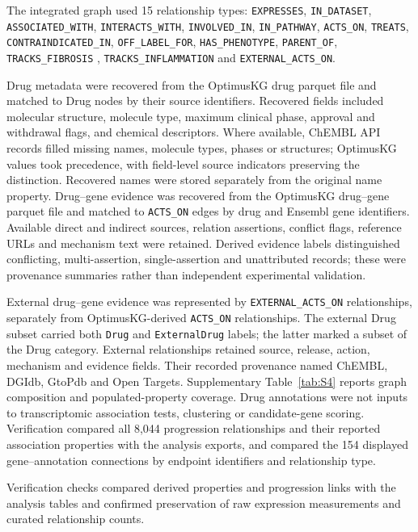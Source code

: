 \documentclass[11pt,a4paper]{article}
\begin{document}
\begingroup\raggedright
The integrated graph used 15 relationship types: \texttt{EXPRESSES}, \texttt{IN\_DATASET}, \texttt{ASSOCIATED\_WITH}, \texttt{INTERACTS\_WITH}, \texttt{INVOLVED\_IN}, \texttt{IN\_PATHWAY}, \texttt{ACTS\_ON}, \texttt{TREATS}, \texttt{CONTRAINDICATED\_IN}, \texttt{OFF\_LABEL\_FOR}, \texttt{HAS\_PHENOTYPE}, \texttt{PARENT\_OF}, \texttt{TRACKS\_FIBROSIS} , \texttt{TRACKS\_INFLAMMATION} and \texttt{EXTERNAL\_ACTS\_ON}.\par
\endgroup

Drug metadata were recovered from the OptimusKG drug parquet file and matched to Drug nodes by their source identifiers. Recovered fields included molecular structure, molecule type, maximum clinical phase, approval and withdrawal flags, and chemical descriptors. Where available, ChEMBL API records filled missing names, molecule types, phases or structures; OptimusKG values took precedence, with field-level source indicators preserving the distinction. Recovered names were stored separately from the original name property. Drug--gene evidence was recovered from the OptimusKG drug--gene parquet file and matched to \texttt{ACTS\_ON} edges by drug and Ensembl gene identifiers. Available direct and indirect sources, relation assertions, conflict flags, reference URLs and mechanism text were retained. Derived evidence labels distinguished conflicting, multi-assertion, single-assertion and unattributed records; these were provenance summaries rather than independent experimental validation.

External drug--gene evidence was represented by \texttt{EXTERNAL\_ACTS\_ON} relationships, separately from OptimusKG-derived \texttt{ACTS\_ON} relationships. The external Drug subset carried both \texttt{Drug} and \texttt{ExternalDrug} labels; the latter marked a subset of the Drug category. External relationships retained source, release, action, mechanism and evidence fields. Their recorded provenance named ChEMBL, DGIdb, GtoPdb and Open Targets. Supplementary Table~\ref{tab:S4} reports graph composition and populated-property coverage. Drug annotations were not inputs to transcriptomic association tests, clustering or candidate-gene scoring. Verification compared all 8,044 progression relationships and their reported association properties with the analysis exports, and compared the 154 displayed gene--annotation connections by endpoint identifiers and relationship type.



 Verification checks compared derived properties and progression links with the analysis tables and confirmed preservation of raw expression measurements and curated relationship counts.
\end{document}
